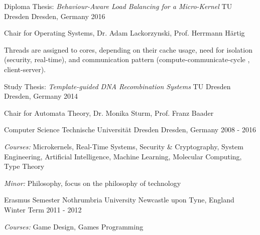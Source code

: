 \begin{cventries}
  \cventry
    {Diploma Thesis: \newline \quad
      \textit{Behaviour-Aware Load Balancing for a Micro-Kernel}}
    {TU Dresden}
    {Dresden, Germany}
    {2016}
    {
      \begin{cvitems}
      \item{Chair for Operating Systems, Dr. Adam Lackorzynski, Prof. Herrmann
	Härtig}
      \item {Threads are assigned to cores, depending on their cache usage,
	  need for isolation (security, real-time), and communication pattern
	  (compute-communicate-cycle , client-server).}
      \end{cvitems}
    }
  \cventry
    {Study Thesis:\quad
      \textit{Template-guided DNA Recombination Systems}}
    {TU Dresden}
    {Dresden, Germany}
    {2014}
    {
      \begin{cvitems}
      \item[] {Chair for Automata Theory, Dr. Monika Sturm, Prof. Franz Baader}
      \end{cvitems}
    }
  \cventry
    {Computer Science}
    {Technische Universität Dresden}
    {Dresden, Germany}
    {2008 - 2016}
    {
      \begin{cvitems}
      \item {\textit{Courses:} Microkernels, Real-Time Systems, Security \&
	  Cryptography, System Engineering, Artificial Intelligence,
	  Machine Learning, \newline \quad Molecular Computing, Type Theory}
      \item {\textit{Minor:} Philosophy, focus on the philosophy of technology}
      \end{cvitems}
    }
  \cventry
    {Erasmus Semester}
    {Nothrumbria University}
    {Newcastle upon Tyne, England}
    {Winter Term 2011 - 2012}
    {
      \begin{cvitems}
      \item[] {\textit{Courses:} Game Design, Games Programming }

\end{cvitems}}
\end{cventries}
